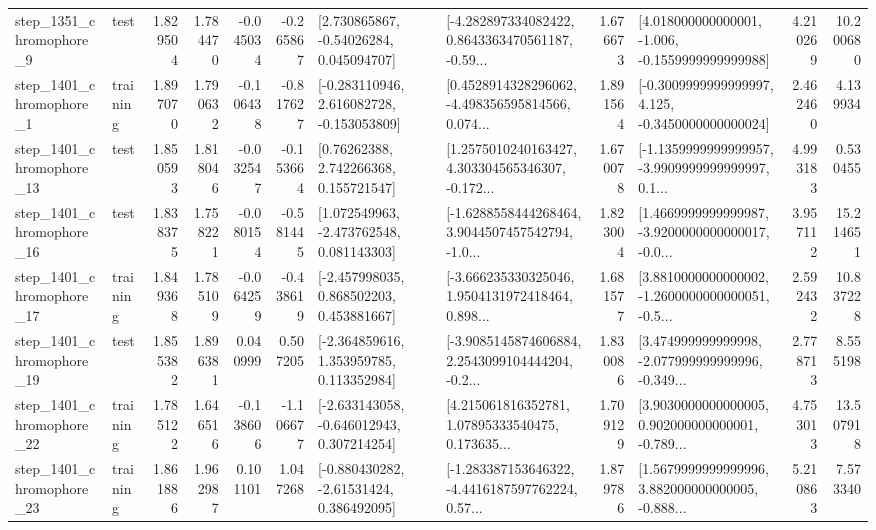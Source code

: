 \begin{tabular}{llrrrrllrlrr}
  step\_1351\_chromophore\_9 &      test &      1.829504 &    1.784470 &     -0.045034 & -0.265867 &     [2.730865867, -0.54026284, 0.045094707] &  [-4.282897334082422, 0.8643363470561187, -0.59... &       1.676673 &   [4.018000000000001, -1.006, -0.1559999999999988] &            4.210269 &         10.200680 \\
  step\_1401\_chromophore\_1 &  training &      1.897070 &    1.790632 &     -0.106438 & -0.817627 &   [-0.283110946, 2.616082728, -0.153053809] &  [0.4528914328296062, -4.498356595814566, 0.074... &       1.891564 &  [-0.3009999999999997, 4.125, -0.3450000000000024] &            2.462460 &          4.139934 \\
 step\_1401\_chromophore\_13 &      test &      1.850593 &    1.818046 &     -0.032547 & -0.153664 &      [0.76262388, 2.742266368, 0.155721547] &  [1.2575010240163427, 4.303304565346307, -0.172... &       1.670078 &  [-1.1359999999999957, -3.9909999999999997, 0.1... &            4.993183 &          0.530455 \\
 step\_1401\_chromophore\_16 &      test &      1.838375 &    1.758221 &     -0.080154 & -0.581445 &    [1.072549963, -2.473762548, 0.081143303] &  [-1.6288558444268464, 3.9044507457542794, -1.0... &       1.823004 &  [1.4669999999999987, -3.9200000000000017, -0.0... &            3.957112 &         15.214651 \\
 step\_1401\_chromophore\_17 &  training &      1.849368 &    1.785109 &     -0.064259 & -0.438619 &    [-2.457998035, 0.868502203, 0.453881667] &  [-3.666235330325046, 1.9504131972418464, 0.898... &       1.681577 &  [3.8810000000000002, -1.2600000000000051, -0.5... &            2.592432 &         10.837228 \\
 step\_1401\_chromophore\_19 &      test &      1.855382 &    1.896381 &      0.040999 &  0.507205 &    [-2.364859616, 1.353959785, 0.113352984] &  [-3.9085145874606884, 2.2543099104444204, -0.2... &       1.830086 &  [3.474999999999998, -2.077999999999996, -0.349... &            2.778713 &          8.555198 \\
 step\_1401\_chromophore\_22 &  training &      1.785122 &    1.646516 &     -0.138606 & -1.106677 &   [-2.633143058, -0.646012943, 0.307214254] &  [4.215061816352781, 1.07895333540475, 0.173635... &       1.709129 &  [3.9030000000000005, 0.902000000000001, -0.789... &            4.753013 &         13.507918 \\
 step\_1401\_chromophore\_23 &  training &      1.861886 &    1.962987 &      0.101101 &  1.047268 &    [-0.880430282, -2.61531424, 0.386492095] &  [-1.283387153646322, -4.4416187597762224, 0.57... &       1.879786 &  [1.5679999999999996, 3.882000000000005, -0.888... &            5.210863 &          7.573340 \\

\end{tabular}
